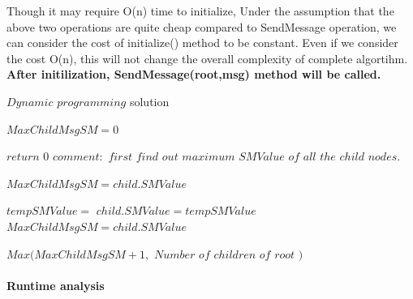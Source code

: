 Though it may require O(n) time to initialize, Under the assumption that the above two operations are quite cheap compared to SendMessage operation, we can consider the cost of initialize() method to be constant. Even if we consider the cost O(n), this will not change the overall complexity of complete algortihm. \\

\textbf{After initilization, SendMessage(root,msg) method will be called. }




\begin{algorithm}
	\caption{$Dynamic $ $programming$ solution}
	\begin{algorithmic}
		\State $ MaxChildMsgSM = 0 $
		
		
			\State $ return$ $ 0$ 	
		\EndIf
	  	\State 		
		\State $comment: $ $ first $ $ find $ $ out $ $ maximum $ $ SMValue $  $ of $ $ all $ $ the $ $ child $ $ nodes.$		
		
		
		\State 
		
		\State		
		
			 \State			 
				\State			 	
			 	\State $ MaxChildMsgSM = child.SMValue$
				
			  \EndIf
				\State
	     \Else
	     \State
		    \State 	
	     	\State $tempSMValue =  $ 
	     	\State $child.SMValue = tempSMValue$
				\State			 	
			 	\State $ MaxChildMsgSM = child.SMValue$
				
				
				\State
			\EndIf
			\State
		\EndIf		
		\State
		\EndIf
		\State
			
		\EndFor
		
		
		
		\Return $ Max(MaxChildMsgSM + 1,$ $ Number$ $ of $ $ children $ $ of $ $ root $ $ ) $
			 				
		
		
	  \EndFunction
	
	  
	\end{algorithmic}
\end{algorithm}

\paragraph{Runtime analysis}

